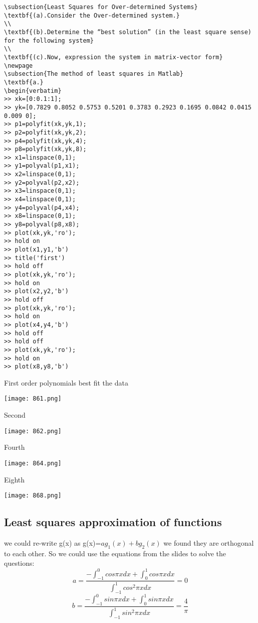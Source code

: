 \begin{verbatim}
\subsection{Least Squares for Over-determined Systems}
\textbf{(a).Consider the Over-determined system.}
\\
\textbf{(b).Determine the “best solution” (in the least square sense) for the following system}
\\
\textbf{(c).Now, expression the system in matrix-vector form}
\newpage
\subsection{The method of least squares in Matlab}
\textbf{a.}
\begin{verbatim}
>> xk=[0:0.1:1];
>> yk=[0.7829 0.8052 0.5753 0.5201 0.3783 0.2923 0.1695 0.0842 0.0415 0.009 0];
>> p1=polyfit(xk,yk,1);
>> p2=polyfit(xk,yk,2);
>> p4=polyfit(xk,yk,4);
>> p8=polyfit(xk,yk,8);
>> x1=linspace(0,1);
>> y1=polyval(p1,x1);
>> x2=linspace(0,1);
>> y2=polyval(p2,x2);
>> x3=linspace(0,1);
>> x4=linspace(0,1);
>> y4=polyval(p4,x4);
>> x8=linspace(0,1);
>> y8=polyval(p8,x8);
>> plot(xk,yk,'ro');
>> hold on
>> plot(x1,y1,'b')
>> title('first')
>> hold off
>> plot(xk,yk,'ro');
>> hold on
>> plot(x2,y2,'b')
>> hold off
>> plot(xk,yk,'ro');
>> hold on
>> plot(x4,y4,'b')
>> hold off
>> hold off
>> plot(xk,yk,'ro');
>> hold on
>> plot(x8,y8,'b')
\end{verbatim}
First order polynomials best fit the data
\begin{center}
    \texttt{[image: 861.png]}
\end{center}
Second 
\begin{center}
    \texttt{[image: 862.png]}
\end{center}
Fourth
\begin{center}
    \texttt{[image: 864.png]}
\end{center}
Eighth
\begin{center}
    \texttt{[image: 868.png]}
\end{center}
\newpage
\subsection{Least squares approximation of functions}
we could re-write g(x) as g(x)=$ag_1(x)+bg_2(x)$ we found they are orthogonal to each other. So we could use the equations from the slides to solve the questions:
\[a=\frac{-\int_{-1}^0 cos\pi x dx+\int_0^1 cos\pi xdx}{\int_{-1}^1 cos^2\pi xdx}=0\]
\[b=\frac{-\int_{-1}^0 sin\pi xdx+\int_0^1 sin\pi xdx}{\int_{-1}^1 sin^2\pi xdx}=\frac{4}{\pi}\]


